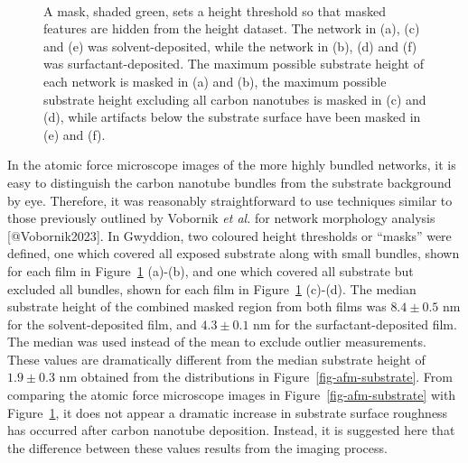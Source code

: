 \documentclass[
  letterpaper,
  DIV=11,
  numbers=noendperiod]{scrartcl}
\begin{document}
\begin{figure}
\begin{minipage}[t]{0.01\linewidth}
{\centering 

~

}

\end{minipage}%

\caption{\label{fig-cnt-mask}A mask, shaded green, sets a height
threshold so that masked features are hidden from the height dataset.
The network in (a), (c) and (e) was solvent-deposited, while the network
in (b), (d) and (f) was surfactant-deposited. The maximum possible
substrate height of each network is masked in (a) and (b), the maximum
possible substrate height excluding all carbon nanotubes is masked in
(c) and (d), while artifacts below the substrate surface have been
masked in (e) and (f).}

\end{figure}

In the atomic force microscope images of the more highly bundled
networks, it is easy to distinguish the carbon nanotube bundles from the
substrate background by eye. Therefore, it was reasonably
straightforward to use techniques similar to those previously outlined
by Vobornik \emph{et al.} for network morphology analysis
{[}@Vobornik2023{]}. In Gwyddion, two coloured height thresholds or
``masks'' were defined, one which covered all exposed substrate along
with small bundles, shown for each film in Figure~\ref{fig-cnt-mask}
(a)-(b), and one which covered all substrate but excluded all bundles,
shown for each film in Figure~\ref{fig-cnt-mask} (c)-(d). The median
substrate height of the combined masked region from both films was
\(8.4 \pm 0.5\) nm for the solvent-deposited film, and \(4.3 \pm 0.1\)
nm for the surfactant-deposited film. The median was used instead of the
mean to exclude outlier measurements. These values are dramatically
different from the median substrate height of \(1.9 \pm 0.3\) nm
obtained from the distributions in Figure~\ref{fig-afm-substrate}. From
comparing the atomic force microscope images in
Figure~\ref{fig-afm-substrate} with Figure~\ref{fig-cnt-mask}, it does
not appear a dramatic increase in substrate surface roughness has
occurred after carbon nanotube deposition. Instead, it is suggested here
that the difference between these values results from the imaging
process.
\end{document}

